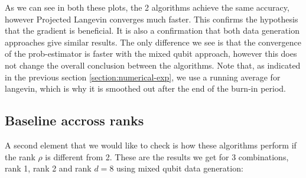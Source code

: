 \documentclass[12pt]{memoir}
\begin{document}
As we can see in both these plots, the 2 algorithms achieve the same accuracy, however Projected Langevin converges much faster. This confirms the hypothesis that the gradient is beneficial. It is also a confirmation that both data generation approaches give similar results. The only difference we see is that the convergence of the prob-estimator is faster with the mixed qubit approach, however this does not change the overall conclusion between the algorithms. Note that, as indicated in the previous section \ref{section:numerical-exp}, we use a running average for langevin, which is why it is smoothed out after the end of the burn-in period.

\subsection*{Baseline accross ranks}
A second element that we would like to check is how these algorithms perform if the rank $\rho$ is different from 2. These are the results we get for 3 combinations, rank 1, rank 2 and rank $d=8$ using mixed qubit data generation:
\end{document}

